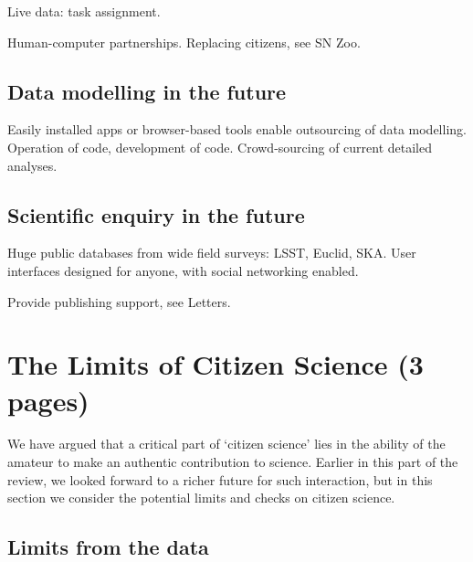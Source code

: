 \documentclass{ar2e}
\begin{document}
Live data: task assignment. 

Human-computer partnerships. Replacing citizens, see SN Zoo.



\subsection{Data modelling in the future}
\label{sec:future:models}

Easily installed apps or browser-based tools enable outsourcing of data
modelling. Operation of code, development of code. Crowd-sourcing of current
detailed analyses.



\subsection{Scientific enquiry in the future}
\label{sec:future:enquiry}

Huge public databases from wide field surveys: LSST, Euclid, SKA. User
interfaces designed for anyone, with social networking enabled. 

Provide publishing support, see Letters.



\section{The Limits of Citizen Science (3 pages)}
\label{sec:limits}

We have argued that a critical part of `citizen science' lies in the ability of
the amateur to make an authentic contribution to science. Earlier in this part
of the review, we looked forward to a richer future for such interaction, but in
this section we consider the potential limits and checks on citizen science. 


\subsection{Limits from the data}
\label{sec:limits:data}
\end{document}
